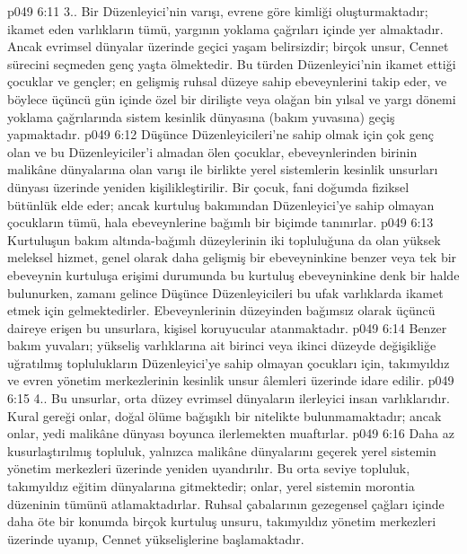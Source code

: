 \vs p049 6:11 3.\bibnobreakspace {}. Bir Düzenleyici’nin varışı, evrene göre kimliği oluşturmaktadır; ikamet eden varlıkların tümü, yargının yoklama çağrıları içinde yer almaktadır. Ancak evrimsel dünyalar üzerinde geçici yaşam belirsizdir; birçok unsur, Cennet sürecini seçmeden genç yaşta ölmektedir. Bu türden Düzenleyici’nin ikamet ettiği çocuklar ve gençler; en gelişmiş ruhsal düzeye sahip ebeveynlerini takip eder, ve böylece üçüncü gün içinde özel bir dirilişte veya olağan bin yılsal ve yargı dönemi yoklama çağrılarında sistem kesinlik dünyasına (bakım yuvasına) geçiş yapmaktadır.
\vs p049 6:12 Düşünce Düzenleyicileri’ne sahip olmak için çok genç olan ve bu Düzenleyiciler’i almadan ölen çocuklar, ebeveynlerinden birinin malikâne dünyalarına olan varışı ile birlikte yerel sistemlerin kesinlik unsurları dünyası üzerinde yeniden kişilikleştirilir. Bir çocuk, fani doğumda fiziksel bütünlük elde eder; ancak kurtuluş bakımından Düzenleyici’ye sahip olmayan çocukların tümü, hala ebeveynlerine bağımlı bir biçimde tanınırlar.
\vs p049 6:13 Kurtuluşun bakım altında\hyp{}bağımlı düzeylerinin iki topluluğuna da olan yüksek meleksel hizmet, genel olarak daha gelişmiş bir ebeveyninkine benzer veya tek bir ebeveynin kurtuluşa erişimi durumunda bu kurtuluş ebeveyninkine denk bir halde bulunurken, zamanı gelince Düşünce Düzenleyicileri bu ufak varlıklarda ikamet etmek için gelmektedirler. Ebeveynlerinin düzeyinden bağımsız olarak üçüncü daireye erişen bu unsurlara, kişisel koruyucular atanmaktadır.
\vs p049 6:14 Benzer bakım yuvaları; yükseliş varlıklarına ait birinci veya ikinci düzeyde değişikliğe uğratılmış toplulukların Düzenleyici’ye sahip olmayan çocukları için, takımyıldız ve evren yönetim merkezlerinin kesinlik unsur âlemleri üzerinde idare edilir.
\vs p049 6:15 4.\bibnobreakspace {}. Bu unsurlar, orta düzey evrimsel dünyaların ilerleyici insan varlıklarıdır. Kural gereği onlar, doğal ölüme bağışıklı bir nitelikte bulunmamaktadır; ancak onlar, yedi malikâne dünyası boyunca ilerlemekten muaftırlar.
\vs p049 6:16 Daha az kusurlaştırılmış topluluk, yalnızca malikâne dünyalarını geçerek yerel sistemin yönetim merkezleri üzerinde yeniden uyandırılır. Bu orta seviye topluluk, takımyıldız eğitim dünyalarına gitmektedir; onlar, yerel sistemin morontia düzeninin tümünü atlamaktadırlar. Ruhsal çabalarının gezegensel çağları içinde daha öte bir konumda birçok kurtuluş unsuru, takımyıldız yönetim merkezleri üzerinde uyanıp, Cennet yükselişlerine başlamaktadır.
